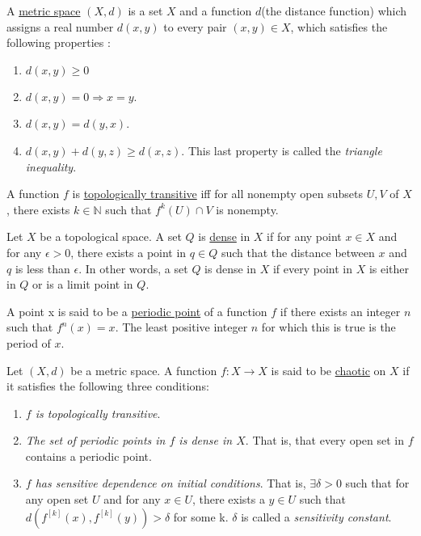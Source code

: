 \begin{defn}
A \underline{metric space} $(X,d)$ is a set $X$ and a function $d$(the distance function) which assigns a real number $d(x,y)$ to every pair $(x,y) \in X$, which satisfies the following properties :

\begin{enumerate}
\item $d(x,y) \ge 0$
\item $d(x,y) = 0 \Rightarrow x=y$.
\item $d(x,y) = d(y,x)$.
\item $d(x,y) + d(y,z) \ge d(x,z)$.  This last property is called the \textit{triangle inequality}.
\end{enumerate}
\end{defn}

\begin{defn}
A function $f$ is \underline{topologically transitive} iff for all nonempty open subsets $U, V$ of $X$, there exists $k \in \mathbb{N}$ such that $f^k(U) \cap V$ is nonempty.
\end{defn}

\begin{defn}
Let $X$ be a topological space.  A set $Q$ is \underline{dense} in $X$ if for any point $x \in X$ and for any $\epsilon > 0$, there exists a point in $q \in Q$ such that the distance between $x$ and $q$ is less than $\epsilon$.  In other words, a set $Q$ is dense in $X$ if every point in $X$ is either in $Q$ or is a limit point in $Q$.
\end{defn}

\begin{defn}
A point x is said to be a \underline{periodic point} of a function $f$ if there exists an integer $n$ such that $f^n(x) = x$.  The least positive integer $n$ for which this is true is the period of $x$.
\end{defn}

\begin{defn}
Let $(X,d)$ be a metric space.  A function $f:X \to X$ is said to be \underline{chaotic} on $X$ if it satisfies the following three conditions:
\begin{enumerate}
\item \textit{$f$ is topologically transitive}.  
\item \textit{The set of periodic points in $f$ is dense in $X$}.  That is, that every open set in $f$ contains a periodic point.
\item \textit{$f$ has sensitive dependence on initial conditions}.  That is, $\exists \delta > 0$ such that for any open set $U$ and for any $x \in U$, there exists a $y \in U$ such that $d(f^{[k]}(x), f^{[k]}(y)) > \delta$ for some k.  $\delta$ is called a \textit{sensitivity constant}.
\end{enumerate}

\end{defn}

